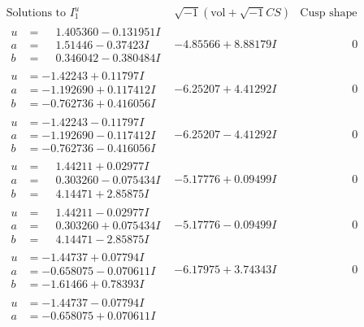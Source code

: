 \documentclass[1p]{elsarticle_modified}
\theoremstyle{definition}
\newcommand{\I}{\sqrt{-1}}
\begin{document}
$$\begin{array}{c|c|c}
\text{Solutions to }I^u_{1}& \I (\text{vol} + \sqrt{-1}CS) & \text{Cusp shape}\\
 \hline 
\begin{aligned}
u &= \phantom{-}1.405360 - 0.131951 I \\
a &= \phantom{-}1.51446 - 0.37423 I \\
b &= \phantom{-}0.346042 - 0.380484 I\end{aligned}
 & -4.85566 + 8.88179 I & \phantom{-0.000000 } 0 \\ \hline\begin{aligned}
u &= -1.42243 + 0.11797 I \\
a &= -1.192690 + 0.117412 I \\
b &= -0.762736 + 0.416056 I\end{aligned}
 & -6.25207 + 4.41292 I & \phantom{-0.000000 } 0 \\ \hline\begin{aligned}
u &= -1.42243 - 0.11797 I \\
a &= -1.192690 - 0.117412 I \\
b &= -0.762736 - 0.416056 I\end{aligned}
 & -6.25207 - 4.41292 I & \phantom{-0.000000 } 0 \\ \hline\begin{aligned}
u &= \phantom{-}1.44211 + 0.02977 I \\
a &= \phantom{-}0.303260 - 0.075434 I \\
b &= \phantom{-}4.14471 + 2.85875 I\end{aligned}
 & -5.17776 + 0.09499 I & \phantom{-0.000000 } 0 \\ \hline\begin{aligned}
u &= \phantom{-}1.44211 - 0.02977 I \\
a &= \phantom{-}0.303260 + 0.075434 I \\
b &= \phantom{-}4.14471 - 2.85875 I\end{aligned}
 & -5.17776 - 0.09499 I & \phantom{-0.000000 } 0 \\ \hline\begin{aligned}
u &= -1.44737 + 0.07794 I \\
a &= -0.658075 - 0.070611 I \\
b &= -1.61466 + 0.78393 I\end{aligned}
 & -6.17975 + 3.74343 I & \phantom{-0.000000 } 0 \\ \hline\begin{aligned}
u &= -1.44737 - 0.07794 I \\
a &= -0.658075 + 0.070611 I \\

\end{aligned}
\end{array}$$
\end{document}
